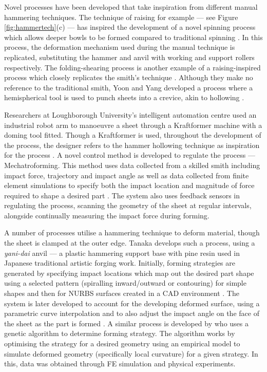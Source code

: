 Novel processes have been developed that take inspiration from different manual hammering techniques. The technique of raising for example --- see Figure \ref{fig:hammertech}(c) --- has inspired the development of a novel spinning process which allows deeper bowls to be formed compared to traditional spinning \citep{Russo2020RaisingSpinning}. In this process, the deformation mechanism used during the manual technique is replicated, substituting the hammer and anvil with working and support rollers respectively. The folding-shearing process is another example of a raising-inspired process which closely replicates the smith's technique \citep{Allwood2019Folding-shearing:Change}. Although they make no reference to the traditional smith, Yoon and Yang developed a process where a hemispherical tool is used to punch sheets into a crevice, akin to hollowing \citep{Yoon2001InvestigationMetal}. 

Researchers at Loughborough University's intelligent automation centre used an industrial robot arm to manoeuvre a sheet through a Kraftformer machine with a doming tool fitted. Though a Kraftformer is used, throughout the development of the process, the designer refers to the hammer hollowing technique as inspiration for the process \citep{Ilangovan2016FixturelessForming}. A novel control method is developed to regulate the process --- Mechatroforming. This method uses data collected from a skilled smith including impact force, trajectory and impact angle as well as data collected from finite element simulations to specify both the impact location and magnitude of force required to shape a desired part \citep{Ilangovan2016AnForming}. The system also uses feedback sensors in regulating the process, scanning the geometry of the sheet at regular intervals, alongside continually measuring the impact force during forming.

A number of processes utilise a hammering technique to deform material, though the sheet is clamped at the outer edge. Tanaka develops such a process, using a \textit{yani-dai} anvil --- a plastic hammering support base with pine resin used in Japanese traditional artistic forging work. Initially, forming strategies are generated by specifying impact locations which map out the desired part shape using a selected pattern (spiralling inward/outward or contouring) for simple shapes \citep{Tanaka2005DevelopmentWorking} and then for NURBS surfaces created in a CAD environment \citep{Tanaka2012DevelopmentSystem}. The system is later developed to account for the developing deformed surface, using a parametric curve interpolation  \citep{Asakawa2010DevelopmentProcess} and to also adjust the impact angle on the face of the sheet as the part is formed \citep{Takasugi2012DevelopmentShape}. A similar process is developed by  \cite{Mori1996DeterminationAlgorithm} who uses a genetic algorithm to determine forming strategy. The algorithm works by optimising the strategy for a desired geometry using an empirical model to simulate deformed geometry (specifically local curvature) for a given strategy. In this, data was obtained through FE simulation and physical experiments.

